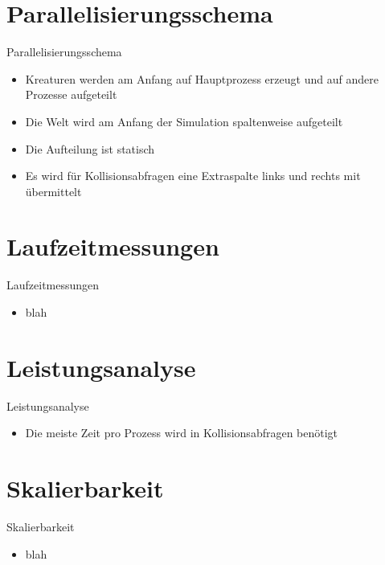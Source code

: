 \documentclass{beamer}
\begin{document}
\section{Parallelisierungsschema}
\begin{frame}{Parallelisierungsschema}
\begin{itemize}
	\item Kreaturen werden am Anfang auf Hauptprozess erzeugt und auf andere Prozesse aufgeteilt
    \item Die Welt wird am Anfang der Simulation spaltenweise aufgeteilt
    \item Die Aufteilung ist statisch
    \item Es wird für Kollisionsabfragen eine Extraspalte links und rechts mit übermittelt
\end{itemize}
\end{frame}


\section{Laufzeitmessungen}
\begin{frame}{Laufzeitmessungen}
\begin{itemize}
    \item blah
\end{itemize}
\end{frame}


\section{Leistungsanalyse}
\begin{frame}{Leistungsanalyse}
\begin{itemize}
    \item Die meiste Zeit pro Prozess wird in Kollisionsabfragen benötigt
\end{itemize}
\end{frame}


\section{Skalierbarkeit}
\begin{frame}{Skalierbarkeit}
\begin{itemize}
    \item blah
\end{itemize}
\end{frame}
\end{document}

